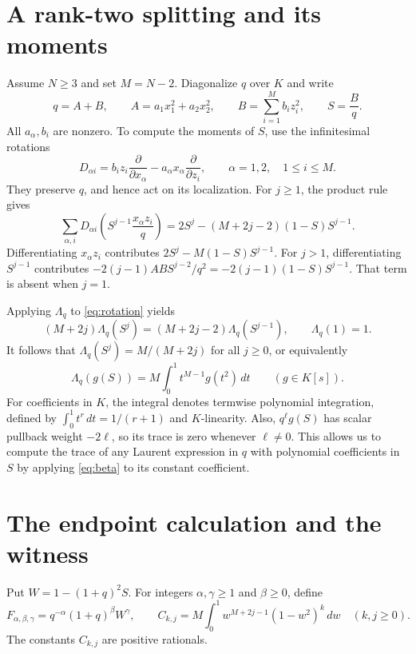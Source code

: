 \documentclass[11pt]{article}
\newcommand{\Lq}{\Lambda_q}
\begin{document}
\section{A rank-two splitting and its moments}\label{sec:beta}

Assume \(N\ge3\) and set \(M=N-2\). Diagonalize \(q\) over \(K\) and write
\[
   q=A+B,\qquad A=a_1x_1^2+a_2x_2^2,\qquad
   B=\sum_{i=1}^M b_i z_i^2,\qquad S=\frac{B}{q}.
\]
All \(a_\alpha,b_i\) are nonzero. To compute the moments of \(S\), use the
infinitesimal rotations
\[
   D_{\alpha i}
   =b_i z_i\frac{\partial}{\partial x_\alpha}
    -a_\alpha x_\alpha\frac{\partial}{\partial z_i},
   \qquad \alpha=1,2,\quad 1\le i\le M.
\]
They preserve \(q\), and hence act on its localization. For \(j\ge1\),
the product rule gives
\begin{equation}\label{eq:rotation}
   \sum_{\alpha,i}D_{\alpha i}
   \left(S^{j-1}\frac{x_\alpha z_i}{q}\right)
     =2S^j-(M+2j-2)(1-S)S^{j-1}.
\end{equation}
Differentiating \(x_\alpha z_i\) contributes
\(2S^j-M(1-S)S^{j-1}\). For \(j>1\), differentiating \(S^{j-1}\)
contributes \(-2(j-1)AB S^{j-2}/q^2
=-2(j-1)(1-S)S^{j-1}\). That term is absent when \(j=1\).

Applying \(\Lq\) to \eqref{eq:rotation} yields
\[
   (M+2j)\Lq(S^j)=(M+2j-2)\Lq(S^{j-1}),
   \qquad \Lq(1)=1.
\]
It follows that \(\Lq(S^j)=M/(M+2j)\) for all \(j\ge0\), or
equivalently
\begin{equation}\label{eq:beta}
   \Lq(g(S))=M\int_0^1 t^{M-1}g(t^2)\,dt\qquad(g\in K[s]).
\end{equation}
For coefficients in \(K\), the integral denotes termwise polynomial
integration, defined by \(\int_0^1t^r\,dt=1/(r+1)\) and \(K\)-linearity.
Also, \(q^\ell g(S)\) has scalar pullback weight \(-2\ell\), so its trace is
zero whenever %
\(\ell \neq 0\)\EndAccSupp{}. This allows us to compute the trace of
any Laurent expression in \(q\) with polynomial coefficients in \(S\)
by applying \eqref{eq:beta} to its constant coefficient.

\section{The endpoint calculation and the witness}\label{sec:endpoint}

Put \(W=1-(1+q)^2 S\). For integers \(\alpha,\gamma\ge1\) and
\(\beta\ge0\), define
\[
 F_{\alpha,\beta,\gamma}=q^{-\alpha}(1+q)^\beta W^\gamma,\qquad
 C_{k,j}=M\int_0^1 w^{M+2j-1}(1-w^2)^k\,dw
 \quad(k,j\ge0).
\]
The constants \(C_{k,j}\) are positive rationals.
\end{document}

